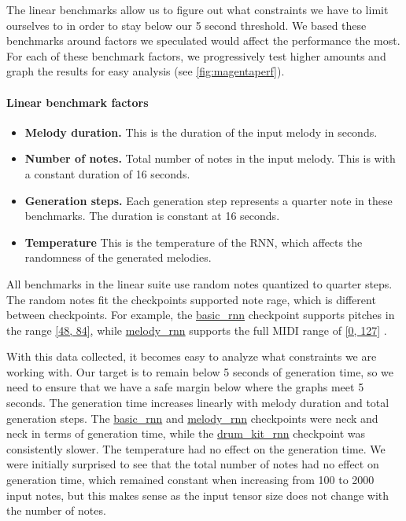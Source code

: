 The linear benchmarks allow us to figure out what constraints we have to limit ourselves
to in order to stay below our 5 second threshold. We based these benchmarks around factors
we speculated would affect the performance the most. For each of these benchmark factors,
we progressively test higher amounts and graph the results for easy analysis (see
\autoref{fig:magentaperf}).

\paragraph{Linear benchmark factors}
\begin{itemize}
  \item \textbf{Melody duration.} This is the duration of the input melody in seconds.
  \item \textbf{Number of notes.} Total number of notes in the input melody. This is with
        a constant duration of 16 seconds.
  \item \textbf{Generation steps.} Each generation step represents a quarter note in these
        benchmarks. The duration is constant at 16 seconds.
  \item \textbf{Temperature} This is the temperature of the RNN, which affects the
        randomness of the generated melodies.
\end{itemize}

All benchmarks in the linear suite use random notes quantized to quarter steps. The random
notes fit the checkpoints supported note rage, which is different between checkpoints. For
example, the \url{basic_rnn} checkpoint supports pitches in the range \url{[48, 84]},
while \url{melody_rnn} supports the full MIDI range of \url{[0, 127]}
\autocite{modelPitchRange}.

With this data collected, it becomes easy to analyze what constraints we are working
with. Our target is to remain below 5 seconds of generation time, so we need to ensure
that we have a safe margin below where the graphs meet 5 seconds. The generation time
increases linearly with melody duration and total generation steps. The \url{basic_rnn}
and \url{melody_rnn} checkpoints were neck and neck in terms of generation time, while the
\url{drum_kit_rnn} checkpoint was consistently slower. The temperature had no effect on
the generation time. We were initially surprised to see that the total number of notes had
no effect on generation time, which remained constant when increasing from 100 to 2000
input notes, but this makes sense as the input tensor size does not change with the number
of notes.


